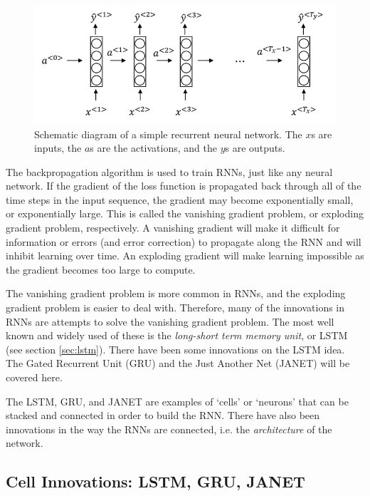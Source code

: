 \documentclass[a4paper,12pt]{article}
\theoremstyle{definition}
\begin{document}
\begin{figure}[ht]
	\centering
	\includegraphics[width=\textwidth]{figures/forward_propagation.png}
	\caption{Schematic diagram of a simple recurrent neural network. The $x$s are inputs, the $a$s are the activations, and the $y$s are outputs.}
	\label{fig:forward_propagation}
\end{figure}

The backpropagation algorithm is used to train RNNs, just like any neural network. If the gradient of the loss function is propagated back through all of the time steps in the input sequence, the gradient may become exponentially small, or exponentially large. This is called the vanishing gradient problem, or exploding gradient problem, respectively. A vanishing gradient will make it difficult for information or errors (and error correction) to propagate along the RNN and will inhibit learning over time. An exploding gradient will make learning impossible as the gradient becomes too large to compute. 

The vanishing gradient problem is more common in RNNs, and the exploding gradient problem is easier to deal with. Therefore, many of the innovations in RNNs are attempts to solve the vanishing gradient problem. The most well known and widely used of these is the \textit{long-short term memory unit}, or LSTM (see section \ref{sec:lstm}). There have been some innovations on the LSTM idea. The Gated Recurrent Unit (GRU) and the Just Another Net (JANET) will be covered here. 

The LSTM, GRU, and JANET are examples of `cells' or `neurons' that can be stacked and connected in order to build the RNN. There have also been innovations in the way the RNNs are connected, i.e. the \textit{architecture} of the network.

\subsection{Cell Innovations: LSTM, GRU, JANET}
\end{document}
